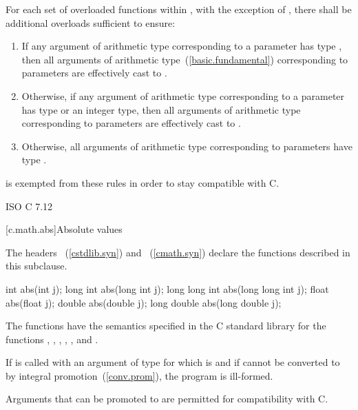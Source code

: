\pnum
For each set of overloaded functions within ,
with the exception of ,
there shall be additional overloads sufficient to ensure:
\begin{enumerate}
  \item If any argument of arithmetic type
    corresponding to a  parameter
    has type ,
    then all arguments of arithmetic type~(\ref{basic.fundamental})
    corresponding to  parameters
    are effectively cast to .
  \item Otherwise, if any argument of arithmetic type
    corresponding to a  parameter
    has type 
    or an integer type,
    then all arguments of arithmetic type
    corresponding to  parameters
    are effectively cast to .
  \item Otherwise, all arguments of arithmetic type
    corresponding to  parameters
    have type .
\end{enumerate}
\begin{note}
 is exempted from these rules in order to stay compatible with C.
\end{note}

\xref
ISO C 7.12

[c.math.abs]{Absolute values}

\pnum
{}%
%
%
%
\begin{note}
The headers ~(\ref{cstdlib.syn}) and
~(\ref{cmath.syn})
declare the functions described in this subclause.
\end{note}

%
\begin{itemdecl}
int abs(int j);
long int abs(long int j);
long long int abs(long long int j);
float abs(float j);
double abs(double j);
long double abs(long double j);
\end{itemdecl}

\begin{itemdescr}
\pnum
\effects
The 
functions have the semantics specified in the C standard library
for the functions , , ,
, , and .

\pnum
\remarks
If  is called with an argument of type 
for which  is  and
if  cannot be converted to 
by integral promotion~(\ref{conv.prom}), the program is ill-formed.
\begin{note}
Arguments that can be promoted to  are permitted for compatibility with C.
\end{note}
\end{itemdescr}

